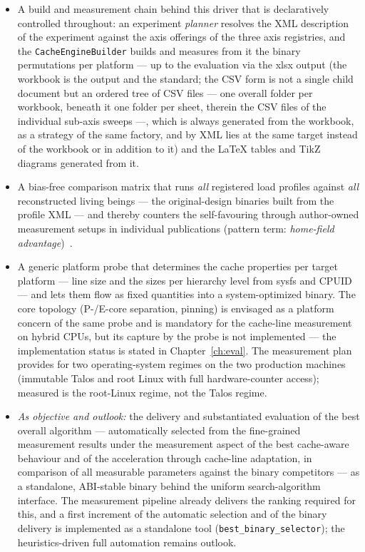 \begin{itemize}
  (individual constituents, interface operations, whole algorithms).
  \item A build and measurement chain behind this driver that is declaratively controlled throughout: an
  experiment \emph{planner} resolves the XML description of the experiment against the axis offerings of the
  three axis registries, and the \texttt{CacheEngineBuilder} builds and measures from it
  the binary permutations per platform --- up to the evaluation via the xlsx output (the workbook
  is the output and the standard; the CSV form is not a single child document but an ordered tree of
  CSV files --- one overall folder per workbook, beneath it one folder per sheet, therein the CSV files of the
  individual sub-axis sweeps ---, which is always generated from the workbook, as a strategy of the same factory,
  and by XML lies at the same target instead of the workbook or in addition to it) and the
  LaTeX tables and TikZ diagrams generated from it.
  \item A bias-free comparison matrix that runs \emph{all} registered load profiles against \emph{all}
  reconstructed living beings --- the original-design binaries built from the profile XML --- and
  thereby counters the self-favouring through author-owned measurement setups in individual publications
  (pattern term: \emph{home-field advantage})~\cite{vanderkouwe2019benchmarking}.
  \item A generic platform probe that determines the cache properties per target platform ---
  line size and the sizes per hierarchy level from sysfs and CPUID --- and lets them flow as fixed quantities into a
  system-optimized binary. The core topology (P-/E-core separation, pinning) is envisaged as a
  platform concern of the same probe and is mandatory for the cache-line measurement on hybrid CPUs,
  but its capture by the probe is not implemented --- the implementation status is stated in
  Chapter~\ref{ch:eval}. The measurement plan provides for two operating-system regimes on the two production machines
  (immutable Talos and root Linux with full hardware-counter access); measured is the
  root-Linux regime, not the Talos regime.
  \item \emph{As objective and outlook:} the delivery and substantiated evaluation of the best
  overall algorithm --- automatically selected from the fine-grained measurement results under the
  measurement aspect of the best cache-aware behaviour and of the acceleration through cache-line adaptation, in
  comparison of all measurable parameters against the binary competitors --- as a standalone, ABI-stable
  binary behind the uniform search-algorithm interface. The measurement pipeline already delivers the
  ranking required for this, and a first increment of the automatic selection and of the
  binary delivery is implemented as a standalone tool (\texttt{best\_binary\_selector});
  the heuristics-driven full automation remains outlook.
\end{itemize}

